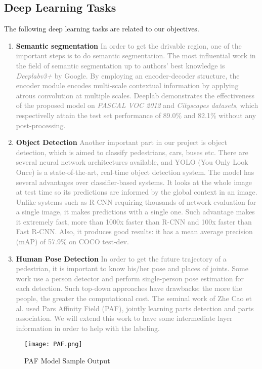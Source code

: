 \subsection{Deep Learning Tasks}
The following deep learning tasks are related to our objectives.
\begin{enumerate}
    \item \textbf{Semantic segmentation}\newline
\textcolor{gray}{In order to get the drivable region, one of the important steps is to do semantic segmentation.  The most influential work in the field of semantic segmentation up to authors' best knowledge is \textit{Deeplabv3+} by Google. By employing an encoder-decoder structure, the encoder module encodes multi-scale contextual information by
applying atrous convolution at multiple scales. Deeplab demonstrates the effectiveness of the proposed model on \textit{PASCAL VOC 2012} and \textit{Cityscapes datasets}, which respectivelly attain the test set performance of 89.0\% and 82.1\% without any post-processing. \cite{Chen2018DeepLab}}

\item \textbf{Object Detection}\newline
\textcolor{gray}{Another important part in our project is object detection, which is aimed to classify pedestrians, cars, buses etc. There are several neural network architectures available, and YOLO (You Only Look Once) \cite{Redmon2018YOLOv3} is a state-of-the-art, real-time object detection system. 
The model has several advantages over classifier-based systems. It looks at the whole image at test time so its predictions are informed by the global context in an image. Unlike systems such as R-CNN requiring thousands of network evaluation for a single image, it makes predictions with a single one. Such advantage makes it extremely fast, more than 1000x faster than R-CNN and 100x faster than Fast R-CNN. Also, it produces good results: it has a mean average precision (mAP) of 57.9\% on COCO test-dev. }

\item \textbf{Human Pose Detection}\newline
\textcolor{gray}{In order to get the future trajectory of a pedestrian, it is important to know his/her pose and places of joints. Some work use a person detector and perform single-person pose estimation for each detection. Such top-down approaches have drawbacks: the more the people, the greater the computational cost. The
seminal work of Zhe Cao et al. \cite{Cao2016Realtime} used Pars Affinity Field (PAF), jointly learning parts detection and parts association. We will extend this work to have some intermediate layer information in order to help with the labeling. }
\end{enumerate}

\begin{figure}[h!]
  \centering \texttt{[image: PAF.png]}
  \caption{PAF Model Sample Output}
  \label{fig:PAF}
\end{figure}
